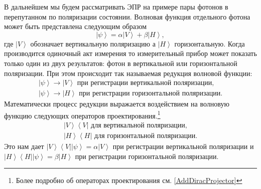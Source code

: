 В дальнейшем мы будем рассматривать ЭПР на примере пары фотонов в перепутанном 
по поляризации состоянии. Волновая функция отдельного фотона может быть 
представлена следующим образом
\begin{equation}
\left|\psi\right> = \alpha \left|V\right> +
\beta \left|H\right>, 
\label{eqEntaglementPSI}
\end{equation}
где $\left|V\right>$ обозначает вертикальную поляризацию а 
$\left|H\right>$ горизонтальную. Когда производится одиночный
акт измерения то измерительный прибор может показать только один из двух 
результатов: фотон в вертикальной или горизонтальной поляризации. При этом происходит 
так называемая редукция волновой функции:
\begin{eqnarray}
\left|\psi\right> \rightarrow \left|V\right> \mbox{ при регистрации вертикальной поляризации},
\nonumber \\
\left|\psi\right> \rightarrow \left|H\right> \mbox{ при регистрации горизонтальной поляризации}.
\nonumber
\end{eqnarray}
Математически процесс редукции выражается воздействием на волновую функцию следующих 
операторов проектирования.\footnote{Более подробно об операторах проектирования см. \ref{AddDiracProjector}}
\begin{eqnarray}
\left|V\right>\left<V\right| \mbox{ для вертикальной поляризации},
\nonumber \\
 \left|H\right>\left<H\right| \mbox{ для горизонтальной поляризации}.
\label{eqEntaglementProjector}
\end{eqnarray}
Это нам дает $\left|V\right>\left<V\right|\left|\psi\right> = \alpha \left|V\right>$ 
при регистрации вертикальной поляризации и
$\left|H\right>\left<H\right|\left|\psi\right> = \beta \left|H\right>$ 
при регистрации горизонтальной поляризации.

